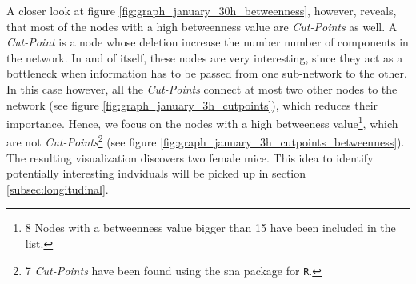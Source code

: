 A closer look at figure \ref{fig:graph_january_30h_betweenness}, however, reveals, that most of the nodes with a high betweenness value are \textit{Cut-Points} as well. A \textit{Cut-Point} is a node whose deletion increase the number number of components in the network\cite{pajek:03}. In and of itself, these nodes are very interesting, since they act as a bottleneck when information has to be passed from one sub-network to the other. In this case however, all the \textit{Cut-Points} connect at most two other nodes to the network (see figure \ref{fig:graph_january_3h_cutpoints}), which reduces their importance. Hence, we focus on the nodes with a high betweeness value\footnote{8 Nodes with a betweenness value bigger than 15 have been included in the list.}, which are not \textit{Cut-Points}\footnote{7 \textit{Cut-Points} have been found using the sna\cite{sna:09} package for \lstinline|R|.} (see figure \ref{fig:graph_january_3h_cutpoints_betweenness}). The resulting visualization discovers two female mice. This idea to identify potentially interesting indviduals will be picked up in section \ref{subsec:longitudinal}. 

